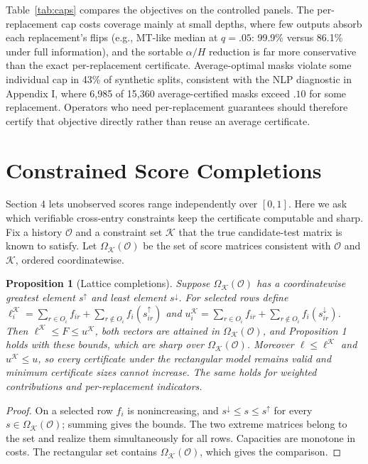 \documentclass[11pt]{article}
\newtheorem{proposition}{Proposition}
\begin{document}
Table~\ref{tab:caps} compares the objectives on the controlled panels. The per-replacement cap costs coverage mainly at small depths, where few outputs absorb each replacement's flips (e.g., MT-like median at $q=.05$: 99.9\% versus 86.1\% under full information), and the sortable $\alpha/H$ reduction is far more conservative than the exact per-replacement certificate. Average-optimal masks violate some individual cap in 43\% of synthetic splits, consistent with the NLP diagnostic in Appendix I, where 6,985 of 15,360 average-certified masks exceed $.10$ for some replacement. Operators who need per-replacement guarantees should therefore certify that objective directly rather than reuse an average certificate.

\section{Constrained Score Completions}
\label{app:lattice}
Section 4 lets unobserved scores range independently over $[0,1]$. Here we ask which verifiable cross-entry constraints keep the certificate computable and sharp. Fix a history $\mathcal O$ and a constraint set $\mathcal K$ that the true candidate-test matrix is known to satisfy. Let $\Omega_{\mathcal K}(\mathcal O)$ be the set of score matrices consistent with $\mathcal O$ and $\mathcal K$, ordered coordinatewise.

\begin{proposition}[Lattice completions]
\label{prop:lattice}
Suppose $\Omega_{\mathcal K}(\mathcal O)$ has a coordinatewise greatest element $s^\uparrow$ and least element $s^\downarrow$. For selected rows define $\ell_i^{\mathcal K}=\sum_{r\in O_i}f_{ir}+\sum_{r\notin O_i}f_i(s^\uparrow_{ir})$ and $u_i^{\mathcal K}=\sum_{r\in O_i}f_{ir}+\sum_{r\notin O_i}f_i(s^\downarrow_{ir})$. Then $\ell^{\mathcal K}\le F\le u^{\mathcal K}$, both vectors are attained in $\Omega_{\mathcal K}(\mathcal O)$, and Proposition 1 holds with these bounds, which are sharp over $\Omega_{\mathcal K}(\mathcal O)$. Moreover $\ell\le\ell^{\mathcal K}$ and $u^{\mathcal K}\le u$, so every certificate under the rectangular model remains valid and minimum certificate sizes cannot increase. The same holds for weighted contributions and per-replacement indicators.
\end{proposition}
\begin{proof}
On a selected row $f_i$ is nonincreasing, and $s^\downarrow\le s\le s^\uparrow$ for every $s\in\Omega_{\mathcal K}(\mathcal O)$; summing gives the bounds. The two extreme matrices belong to the set and realize them simultaneously for all rows. Capacities are monotone in costs. The rectangular set contains $\Omega_{\mathcal K}(\mathcal O)$, which gives the comparison.
\end{proof}
\end{document}
